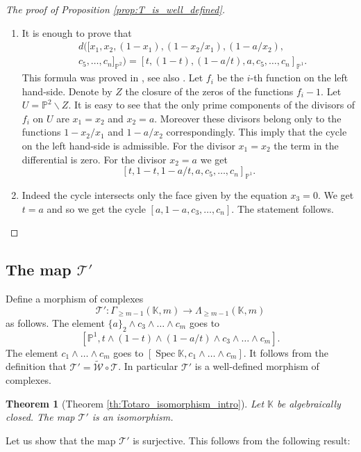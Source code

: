 \documentclass[12pt]{extarticle}
\newtheorem{theorem}{Theorem}[section]
\def\mb{\mathbb}
\def\mc{\mathcal}
\def\L{\Lambda}
\def\k{\mb K}
\def\wt{\widetilde}
\renewcommand{\P}{{\mb P}}
\def\wdw{\wedge\dots\wedge}
\def\PP{\mathbb P^1\times\mathbb P^1}
\def\bs{\backslash}
\def\T{\mc T}
\def\W{\mc W}
\def \tW{\wt{\W}}
\def \wW{\tW}
\def \wL{\L_{\geq m-1}}
\def \wG{\Gamma_{\geq m-1}}
\DeclareMathOperator{\spec}{Spec}
\begin{document}
\begin{proof}[The proof of Proposition \ref{prop:T_is_well_defined}]
\begin{enumerate}
        $$\left[t, 1-t, (1-a/t), \dfrac{(w-b_1b_2)(w-1)}{(w-b_1)(w-b_2)}, w, c_5,\dots, c_n\right]_{\PP}.$$
        \item It is enough to prove that
        \begin{align*}
        &d([x_1,x_2,(1-x_1),(1-x_2/x_1),(1-a/x_2),\\& c_5,\dots, c_{n}]_{\P^2})=
        [t,(1-t),(1-a/t),a,c_5,\dots,c_{n}]_{\P^1}.
    \end{align*}
This formula was proved in \cite{bloch_rriz_1994_mixed}, see also \cite{goncharov_levin_gangl_2009_muly_polyl_alg_cycles}. Let $f_i$ be the $i$-th function on the left hand-side. Denote by $Z$ the closure of the zeros of the functions $f_i-1$. Let $U=\P^2\bs Z$. It is easy to see that the only prime components of the divisors of $f_i$ on $U$ are $x_1=x_2$ and $x_2=a$. Moreover these divisors belong only to the functions $1-x_2/x_1$ and $1-a/x_2$ correspondingly. This imply that the cycle on the left hand-side is admissible. For the divisor $x_1=x_2$ the term in the differential is zero. For  the divisor $x_2=a$ we get 
$$[t,1-t,1-a/t, a, c_5,\dots, c_{n}]_{\P^1}.$$
        \item Indeed the cycle intersects only the face given by the equation $x_3=0$. We get $t=a$ and so we get the cycle $[a,1-a,c_3,\dots, c_n]$. The statement follows.
        \end{enumerate}
\end{proof}

\subsection{The map $\mc T'$}
\label{subsec:map:Totaro_prime}
Define a morphism of complexes $$\T'\colon \wG(\k,m)\to \wL(\k, m)$$ as follows. The element $\{a\}_2\wedge c_3\wdw c_m$ goes to
$$[\P^1, t\wedge (1-t)\wedge (1-a/t)\wedge c_3\wdw c_m].$$
The element $c_1\wdw c_m$ goes to
$[\spec \k, c_1\wdw c_m]$. It follows from the definition that $\mc T'=\wW\circ\mc T$. In particular $\mc T'$ is a well-defined morphism of complexes. 

\begin{theorem}[Theorem \ref{th:Totaro_isomorphism_intro}]
\label{th:Totaro_is_morphism_of_complexes}
    Let $\k$ be algebraically closed. The map $\T'$ is an isomorphism.
\end{theorem}

Let us show that the map $\mc T'$ is surjective. This follows from the following result:
\end{document}
